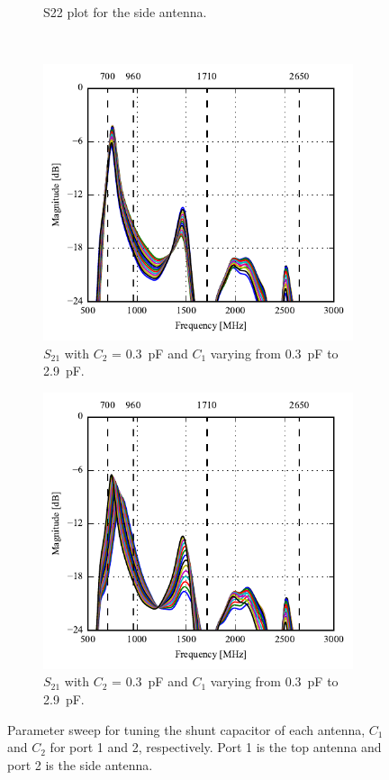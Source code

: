 \begin{figure}[htbp]
\begin{subfigure}[b]{0.49\linewidth}
        \caption{S22 plot for the side antenna.}
        \label{fig:ant1_s22}
    \end{subfigure}
~
    \begin{subfigure}[b]{0.49\linewidth}
        \centering
        \includegraphics{img/tech_sol/monopole/s21-s11}
        \caption{$S_{21}$ with $C_2$ = \SI{0.3}{pF} and $C_1$ varying from \SI{0.3}{pF} to \SI{2.9}{pF}.}
        \label{fig:ant1_s11}
    \end{subfigure}
    \hfill
    \begin{subfigure}[b]{0.49\linewidth}
        \centering
        \includegraphics{img/tech_sol/monopole/s21-s22}
        \caption{$S_{21}$ with $C_2$ = \SI{0.3}{pF} and $C_1$ varying from \SI{0.3}{pF} to \SI{2.9}{pF}.}
        \label{fig:ant1_s22}
    \end{subfigure}
    \caption{Parameter sweep for tuning the shunt capacitor of each antenna, $C_1$ and $C_2$ for port 1 and 2, respectively. Port 1 is the top antenna and port 2 is the side antenna.}
    \label{fig:sparam_mono}
\end{figure}


